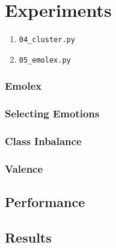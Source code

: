 \chapter{Experiments}\label{chap:Experiments}


\begin{enumerate}
  \item \lstinline{04_cluster.py}
  \item \lstinline{05_emolex.py}
\end{enumerate}

\subsection{Emolex}\label{sub:Emolex}
\subsection{Selecting Emotions}\label{sub:Selecting Emotions}
\subsection{Class Inbalance}\label{sub:Class Inbalance}
\subsection{Valence}\label{sub:Valence}





\section{Performance}\label{sec:Performance}

\section{Results}\label{sec:Results}


